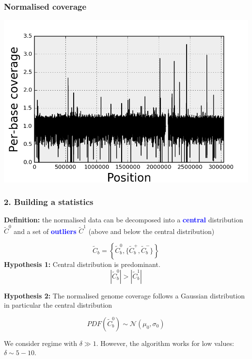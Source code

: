 \documentclass{beamer}
\begin{document}
\begin{frame}
\frametitle{Normalised coverage}
\begin{center}
\includegraphics[height=0.9\textheight, 
    width=1\textwidth]{images/coverage_normalised.png}
\end{center} 
\end{frame}




\begin{frame}
 \frametitle{2. Building a statistics}
 
\textbf{Definition:} the normalised data can be decomposed 
into a \textbf{\textcolor{blue}{central}}
distribution $\widetilde{C}^0$ and a set 
of \textbf{\textcolor{blue}{outliers}} $\widetilde{C}^1$ (above and below 
the central distribution)

\begin{equation} 
\widetilde{C}_b  = \left\{ \widetilde{C}^0_b, \{\widetilde{C}^+_b, 
\widetilde{C}^-_b\}  \right\}
\nonumber
\end{equation}
\vspace{1cm}
\textbf{Hypothesis 1:} Central distribution is predominant.
\begin{equation}
\left|\widetilde{C}^0_b\right| > \left|\widetilde{C}^1_b\right| \nonumber
\end{equation}
\end{frame}



\begin{frame}
\textbf{Hypothesis 2:} The normalised genome coverage follows a 
Gaussian distribution in particular the central distribution

\begin{equation}
PDF(\widetilde{C}_b^0) \sim \mathcal{N}(\mu_0, \sigma_0) \nonumber
\end{equation}

We consider regime with $\delta \gg 1$. However, the algorithm 
works for low values: $\delta \sim 5-10$.
 \end{frame}
\end{document}
